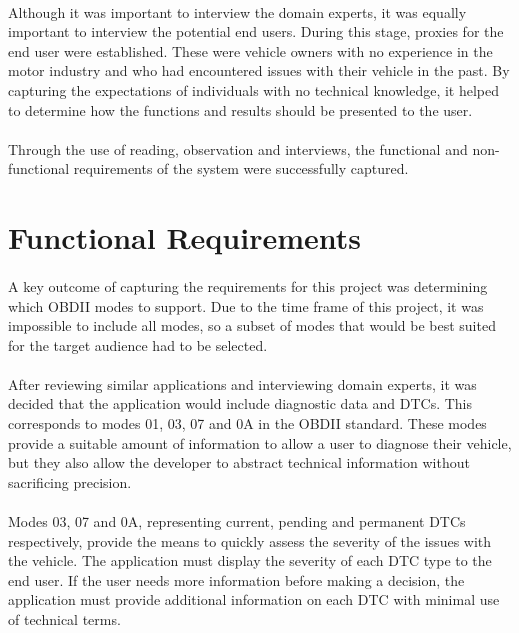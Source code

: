	\paragraph{}{
	Although it was important to interview the domain experts, it was equally important to interview the potential end users. During this stage, proxies for the end user were established. These were vehicle owners with no experience in the motor industry and who had encountered issues with their vehicle in the past. By capturing the expectations of individuals with no technical knowledge, it helped to determine how the functions and results should be presented to the user.
	}
	\paragraph{}{
	Through the use of reading, observation and interviews, the functional and non-functional requirements of the system were successfully captured.
	}
	
\section{Functional Requirements}	
	\paragraph{}{
	A key outcome of capturing the requirements for this project was determining which OBDII modes to support. Due to the time frame of this project, it was impossible to include all modes, so a subset of modes that would be best suited for the target audience had to be selected.
	}
	\paragraph{}{
	After reviewing similar applications and interviewing domain experts, it was decided that the application would include diagnostic data and DTCs. This corresponds to modes 01, 03, 07 and 0A in the OBDII standard. These modes provide a suitable amount of information to allow a user to diagnose their vehicle, but they also allow the developer to abstract technical information without sacrificing precision.
	}
	\paragraph{}{
	Modes 03, 07 and 0A, representing current, pending and permanent DTCs respectively, provide the means to quickly assess the severity of the issues with the vehicle. The application must display the severity of each DTC type to the end user. If the user needs more information before making a decision, the application must provide additional information on each DTC with minimal use of technical terms.
	}
